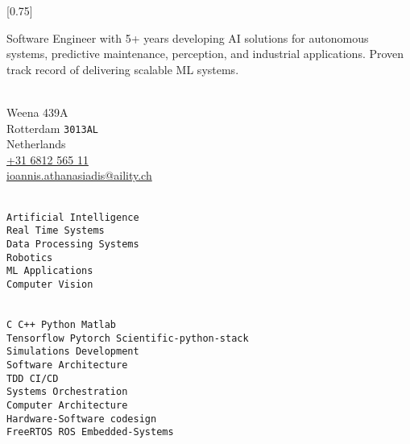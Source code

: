 \documentclass[lighthipster]{simplehipstercv}
\begin{document}
\setlength{\columnsep}{0.8cm}
[0.75]
\begin{paracol}{2}

\paracolbackgroundoptions


\footnotesize
{\setasidefontcolour
\flushright
\begin{center}
Software Engineer with 5+ years developing AI solutions for autonomous systems, predictive maintenance, perception, and industrial applications. Proven track record of delivering scalable ML systems.
\end{center}
\bigskip

\bigskip

\\[0.5em]
{\footnotesize
Weena 439A\\ %
Rotterdam \texttt{3013AL}\\
Netherlands\\[.2cm]
\href{tel:+31681256511}{+31 6812 565 11}\\ %
\href{mailto:ioannis.athanasiadis@aility.ch}{ioannis.athanasiadis@aility.ch}} %
\bigskip

\bigskip

\\[0.5em]
\texttt{Artificial Intelligence}\\[0.1em]
\texttt{Real Time Systems}\\[0.1em]
\texttt{Data Processing Systems}\\[0.1em]
\texttt{Robotics}\\[0.1em]
\texttt{ML Applications}\\[0.1em]
\texttt{Computer Vision}\\[0.1em]
\bigskip

\bigskip

\\[0.5em]
\texttt{C C++ Python Matlab}\\
\texttt{Tensorflow Pytorch Scientific-python-stack}\\
\texttt{Simulations Development}\\
\texttt{Software Architecture}\\
\texttt{TDD CI/CD}\\
\texttt{Systems Orchestration}\\
\texttt{Computer Architecture}\\
\texttt{Hardware-Software codesign}\\
\texttt{FreeRTOS ROS Embedded-Systems}
\bigskip

}
\end{paracol}
\end{document}
